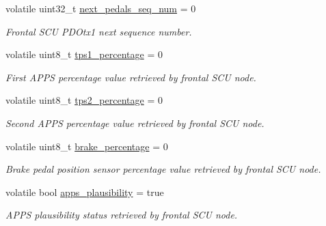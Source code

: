 \begin{DoxyCompactItemize}
volatile uint32\+\_\+t \mbox{\hyperlink{group___c_a_n__servizi__group_gadcbd4ad67b50cf61731266bf5c5ba158}{next\+\_\+pedals\+\_\+seq\+\_\+num}} = 0
\begin{DoxyCompactList}\small\item\em Frontal S\+CU P\+D\+Otx1 next sequence number. \end{DoxyCompactList}\item 
\mbox{\label{group___c_a_n__servizi__group_ga1d42f28ccf027a3243fad064fa47ef81}} 
volatile uint8\+\_\+t \mbox{\hyperlink{group___c_a_n__servizi__group_ga1d42f28ccf027a3243fad064fa47ef81}{tps1\+\_\+percentage}} = 0
\begin{DoxyCompactList}\small\item\em First A\+P\+PS percentage value retrieved by frontal S\+CU node. \end{DoxyCompactList}\item 
\mbox{\label{group___c_a_n__servizi__group_gaf69d82f83885abc5adbd5fcbf4c421cf}} 
volatile uint8\+\_\+t \mbox{\hyperlink{group___c_a_n__servizi__group_gaf69d82f83885abc5adbd5fcbf4c421cf}{tps2\+\_\+percentage}} = 0
\begin{DoxyCompactList}\small\item\em Second A\+P\+PS percentage value retrieved by frontal S\+CU node. \end{DoxyCompactList}\item 
\mbox{\label{group___c_a_n__servizi__group_ga8e50a30864da7026531520887968d4c0}} 
volatile uint8\+\_\+t \mbox{\hyperlink{group___c_a_n__servizi__group_ga8e50a30864da7026531520887968d4c0}{brake\+\_\+percentage}} = 0
\begin{DoxyCompactList}\small\item\em Brake pedal position sensor percentage value retrieved by frontal S\+CU node. \end{DoxyCompactList}\item 
\mbox{\label{group___c_a_n__servizi__group_gaa9de48f5a49bc92a608ed315c087f3a6}} 
volatile bool \mbox{\hyperlink{group___c_a_n__servizi__group_gaa9de48f5a49bc92a608ed315c087f3a6}{apps\+\_\+plausibility}} = true
\begin{DoxyCompactList}\small\item\em A\+P\+PS plausibility status retrieved by frontal S\+CU node. \end{DoxyCompactList}\item 

\end{DoxyCompactItemize}
